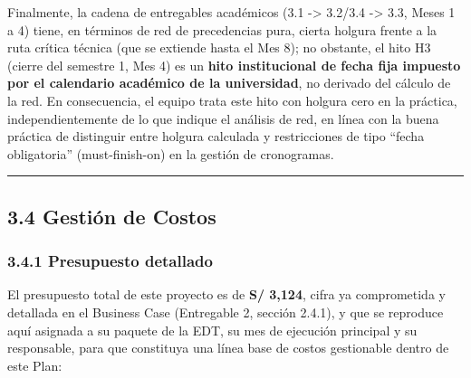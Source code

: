 \documentclass[11pt,a4paper]{article}
\begin{document}
Finalmente, la cadena de entregables académicos (3.1 -\textgreater{} 3.2/3.4 -\textgreater{} 3.3, Meses 1 a 4) tiene, en términos de red de precedencias pura, cierta holgura frente a la ruta crítica técnica (que se extiende hasta el Mes 8); no obstante, el hito H3 (cierre del semestre 1, Mes 4) es un \textbf{hito institucional de fecha fija impuesto por el calendario académico de la universidad}, no derivado del cálculo de la red. En consecuencia, el equipo trata este hito con holgura cero en la práctica, independientemente de lo que indique el análisis de red, en línea con la buena práctica de distinguir entre holgura calculada y restricciones de tipo ``fecha obligatoria'' (must-finish-on) en la gestión de cronogramas.

\begin{center}\rule{0.5\linewidth}{0.5pt}\end{center}

\subsection{3.4 Gestión de Costos}\label{gestiuxf3n-de-costos}

\subsubsection{3.4.1 Presupuesto detallado}\label{presupuesto-detallado}

El presupuesto total de este proyecto es de \textbf{S/ 3,124}, cifra ya comprometida y detallada en el Business Case (Entregable 2, sección 2.4.1), y que se reproduce aquí asignada a su paquete de la EDT, su mes de ejecución principal y su responsable, para que constituya una línea base de costos gestionable dentro de este Plan:
\end{document}
